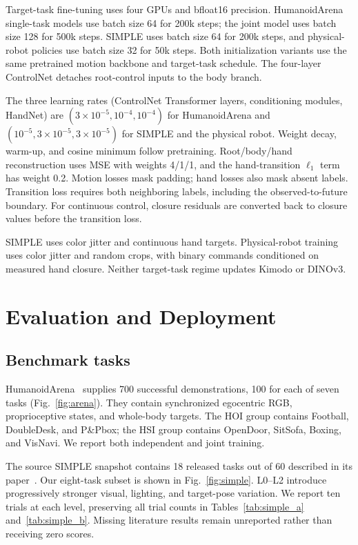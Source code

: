 Target-task fine-tuning uses four GPUs and bfloat16 precision. HumanoidArena single-task models use batch size 64 for 200k steps; the joint model uses batch size 128 for 500k steps. SIMPLE uses batch size 64 for 200k steps, and physical-robot policies use batch size 32 for 50k steps. Both initialization variants use the same pretrained motion backbone and target-task schedule. The four-layer ControlNet detaches root-control inputs to the body branch.

The three learning rates (ControlNet Transformer layers, conditioning modules, HandNet) are $(3\times10^{-5},10^{-4},10^{-4})$ for HumanoidArena and $(10^{-5},3\times10^{-5},3\times10^{-5})$ for SIMPLE and the physical robot. Weight decay, warm-up, and cosine minimum follow pretraining. Root/body/hand reconstruction uses MSE with weights 4/1/1, and the hand-transition $\ell_1$ term has weight 0.2. Motion losses mask padding; hand losses also mask absent labels. Transition loss requires both neighboring labels, including the observed-to-future boundary. For continuous control, closure residuals are converted back to closure values before the transition loss.

SIMPLE uses color jitter and continuous hand targets. Physical-robot training uses color jitter and random crops, with binary commands conditioned on measured hand closure. Neither target-task regime updates Kimodo or DINOv3.

\section{Evaluation and Deployment}
\subsection{Benchmark tasks}
HumanoidArena~\cite{humanoidarena,sonic} supplies 700 successful demonstrations, 100 for each of seven tasks (Fig.~\ref{fig:arena}). They contain synchronized egocentric RGB, proprioceptive states, and whole-body targets. The HOI group contains Football, DoubleDesk, and P\&Pbox; the HSI group contains OpenDoor, SitSofa, Boxing, and VisNavi. We report both independent and joint training.

The source SIMPLE snapshot contains 18 released tasks out of 60 described in its paper~\cite{simple}. Our eight-task subset is shown in Fig.~\ref{fig:simple}. L0--L2 introduce progressively stronger visual, lighting, and target-pose variation. We report ten trials at each level, preserving all trial counts in Tables~\ref{tab:simple_a} and~\ref{tab:simple_b}. Missing literature results remain unreported rather than receiving zero scores.

